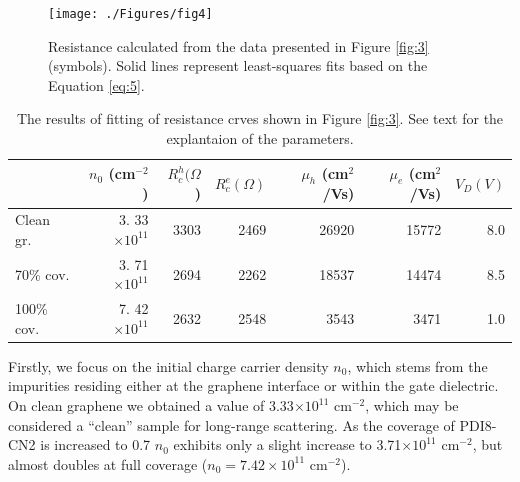 \documentclass[preprint,aip,jap]{revtex4-2}
\begin{document}
\begin{figure}[htb]
  \centering
   \texttt{[image: ./Figures/fig4]}  
  \caption{Resistance calculated from the data presented in Figure {\ref{fig:3}} (symbols).
 Solid lines represent least-squares fits based on the Equation \ref{eq:5}.
}
  \label{fig:4}
\end{figure}

\noindent \begin{table}[h]
  \centering
  \begin{tabular}{|l|r|r|r|r|r|r|} \hline%
   & $n_{0}$ (cm$^{-2}$ )& $R_{c}^{h}(\Omega$) & $R_{c}^{e}(\Omega)$ & $\mu_{h}$ (cm$^{2}$/Vs) & $\mu_{e}$ (cm$^{2}$/Vs) & $V_{D}(V) $  \\ \hline%
    Clean gr.
 & 3.
33$\times 10^{11}$ & 3303 & 2469 & 26920 & 15772 & 8.0 \\
    70\% cov.
 &3.
71$\times 10^{11}$ & 2694 & 2262 & 18537 & 14474 & 8.5 \\
     100\% cov.
 &7.
42$\times 10^{11}$ & 2632 & 2548 & 3543 & 3471 & 1.0 \\ \hline
    
  \end{tabular}
  \caption{The results of fitting of resistance crves shown in Figure \ref{fig:3}.
 See  text for the explantaion of the parameters.
}
  \label{tab:1}
\end{table}


Firstly, we focus on the initial charge carrier density $n_0$, which stems from the impurities residing either at the graphene interface or within the gate dielectric.
 On clean graphene we obtained a value of 3.33$\times 10^{11}$ cm$^{-2}$, which may be considered a ``clean'' sample for long-range scattering.
  As the coverage of PDI8-CN2 is increased to 0.7 $n_0$ exhibits only a slight increase to 3.71$\times 10^{11}$ cm$^{-2}$, but almost doubles at full coverage ($n_{0}=7.42\times 10^{11}$ cm$^{-2}$).
\end{document}
